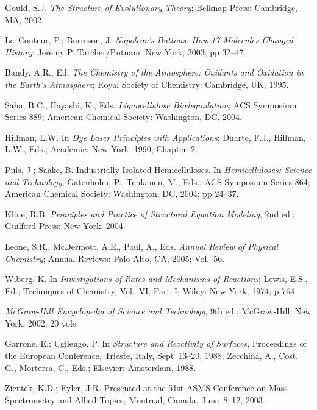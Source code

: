 \documentclass[]{interact}
\theoremstyle{plain}%
\theoremstyle{definition}
\theoremstyle{remark}
\begin{document}
\begin{thebibliography}{99}

Gould, S.J. \emph{The Structure of Evolutionary Theory}; Belknap Press:
  Cambridge, MA, 2002.

Le~Couteur, P.; Burreson, J. \emph{Napoleon's Buttons: How 17 Molecules Changed
  History}; Jeremy P. Tarcher/Putnam: New York, 2003; pp 32--47.

Bandy, A.R., Ed. \emph{The Chemistry of the Atmosphere: Oxidants and Oxidation
  in the Earth's Atmosphere}; Royal Society of Chemistry: Cambridge, UK, 1995.

Saha, B.C., Hayashi, K., Eds. \emph{Lignocellulose Biodegradation}; ACS
  Symposium Series 889; American Chemical Society: Washington, DC, 2004.

Hillman, L.W. In \emph{Dye Laser Principles with Applications}; Duarte, F.J.,
  Hillman, L.W., Eds.; Academic: New York, 1990; Chapter~2.

Puls, J.; Saake, B. Industrially Isolated Hemicelluloses. In
  \emph{Hemicelluloses: Science and Technology}; Gatenholm, P., Tenkanen, M.,
  Eds.; ACS Symposium Series 864; American Chemical Society: Washington, DC,
  2004; pp 24--37.

Kline, R.B. \emph{Principles and Practice of Structural Equation Modeling}, 2nd
  ed.; Guilford Press: New York, 2004.

Leone, S.R., McDermott, A.E., Paul, A., Eds. \emph{Annual Review of Physical
  Chemistry}; Annual Reviews: Palo Alto, CA, 2005; Vol.~56.

Wiberg, K. In \emph{Investigations of Rates and Mechanisms of Reactions};
  Lewis, E.S., Ed.; Techniques of Chemistry, Vol.~VI, Part~I; Wiley: New York,
  1974; p 764.

\emph{McGraw-Hill Encyclopedia of Science and Technology}, 9th ed.;
  McGraw-Hill: New York, 2002; 20 vols.

Garrone, E.; Ugliengo, P. In \emph{Structure and Reactivity of Surfaces},
  Proceedings of the European Conference, Trieste, Italy, Sept~13--20, 1988;
  Zecchina, A., Cost, G., Morterra, C., Eds.; Elsevier: Amsterdam, 1988.

Zientek, K.D.; Eyler, J.R. Presented at the 51st ASMS Conference on Mass
  Spectrometry and Allied Topics, Montreal, Canada, June~8--12, 2003.


\end{thebibliography}
\end{document}
